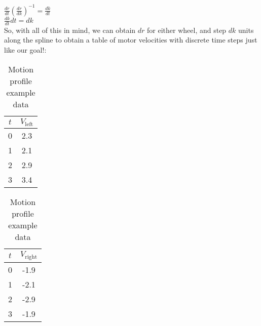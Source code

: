 \documentclass[12pt, english]{article}
\begin{document}
$\frac{dr}{dt} \left(\frac{dr}{dk}\right)^{-1} = \frac{dk}{dt}$ \\

$\frac{dk}{dt}dt = dk$ \\

So, with all of this in mind, we can obtain $dr$ for either wheel, and step $dk$ units along the spline to obtain a table of motor velocities with discrete time steps just like our goal!:

\begin{table}[h!]
	\begin{center}
		\begin{tabular}{ | c | c | }
			\hline
			$t$ & $V_{\text{left}}$ \\
			\hline
			\hline
			0 & 2.3 \\
			1 & 2.1 \\
			2 & 2.9 \\
			3 & 3.4 \\
		\end{tabular}
		\quad
		\begin{tabular}{ | c | c | }
			\hline
			$t$ & $V_{\text{right}}$ \\
			\hline
			\hline
			0 & -1.9 \\
			1 & -2.1 \\
			2 & -2.9 \\
			3 & -1.9 \\
		\end{tabular}
		\caption{Motion profile example data}
	\end{center}
\end{table}
\end{document}
